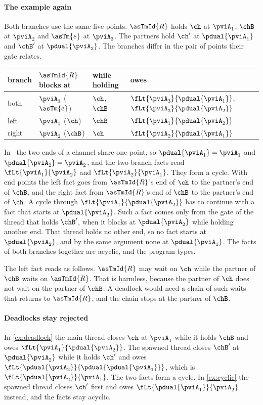 \paragraph{The example again}
Both branches use the same five points. $\asTmId{R}$ holds $\ch$ at
$\pviA_1$, $\chB$ at $\pviA_2$ and $\asTm{e}$ at $\pviA_3$. The partners
hold $\ch'$ at $\pdual{\pviA_1}$ and $\chB'$ at $\pdual{\pviA_2}$. The
branches differ in the pair of points their gate relates.
\begin{center}
  \begin{tabular}{llll}
    branch & $\asTmId{R}$ blocks at & while holding & owes \\
    \hline
    both  & $\pviA_3$ ($\asTm{e}$) & $\ch$, $\chB$ & $\fLt{\pviA_3}{\pdual{\pviA_1}}$, $\fLt{\pviA_3}{\pdual{\pviA_2}}$ \\
    left  & $\pviA_1$ ($\ch$)      & $\chB$        & $\fLt{\pviA_1}{\pdual{\pviA_2}}$ \\
    right & $\pviA_2$ ($\chB$)     & $\ch$         & $\fLt{\pviA_2}{\pdual{\pviA_1}}$
  \end{tabular}
\end{center}
In \OurLang\ the two ends of a channel share one point, so
$\pdual{\pviA_1} = \pviA_1$ and $\pdual{\pviA_2} = \pviA_2$, and the two
branch facts read $\fLt{\pviA_1}{\pviA_2}$ and $\fLt{\pviA_2}{\pviA_1}$.
They form a cycle. With end points the left fact goes from
$\asTmId{R}$'s end of $\ch$ to the partner's end of $\chB$, and the right
fact from $\asTmId{R}$'s end of $\chB$ to the partner's end of $\ch$. A
cycle through $\fLt{\pviA_1}{\pdual{\pviA_2}}$ has to continue with a
fact that starts at $\pdual{\pviA_2}$. Such a fact comes only from the
gate of the thread that holds $\chB'$, when it blocks at
$\pdual{\pviA_2}$ while holding another end. That thread holds no other
end, so no fact starts at $\pdual{\pviA_2}$, and by the same argument
none at $\pdual{\pviA_1}$. The facts of both branches together are
acyclic, and the program types.

The left fact reads as follows. $\asTmId{R}$ may wait on $\ch$ while the
partner of $\chB$ waits on $\asTmId{R}$. That is harmless, because the
partner of $\ch$ does not wait on the partner of $\chB$. A deadlock would
need a chain of such waits that returns to $\asTmId{R}$, and the chain
stops at the partner of $\chB$.

\paragraph{Deadlocks stay rejected}
In \cref{ex:deadlock} the main thread closes $\ch$ at $\pviA_1$ while it
holds $\chB$ and owes $\fLt{\pviA_1}{\pdual{\pviA_2}}$. The spawned
thread closes $\chB'$ at $\pdual{\pviA_2}$ while it holds $\ch'$ and owes
$\fLt{\pdual{\pviA_2}}{\pdual{\pdual{\pviA_1}}}$, which is
$\fLt{\pdual{\pviA_2}}{\pviA_1}$. The two facts form a cycle. In
\cref{ex:cyclic} the spawned thread closes $\ch'$ first and owes
$\fLt{\pdual{\pviA_1}}{\pviA_2}$ instead, and the facts stay acyclic.

